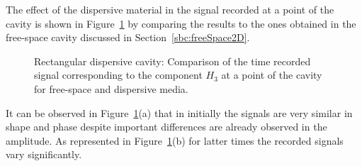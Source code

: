 The effect of the dispersive material in the signal recorded at a point of the cavity is shown in Figure~\ref{fig:freeSpaceDispersiveSignal} by comparing the results to the ones obtained in the free-space cavity discussed in Section~\ref{sbc:freeSpace2D}.
\begin{figure}[!ht]
	\centering
	\caption{Rectangular dispersive cavity: Comparison of the time recorded signal corresponding to the component $H_3$ at a point of the cavity for free-space and dispersive media.}
	\label{fig:freeSpaceDispersiveSignal}
\end{figure}
It can be observed in Figure~\ref{fig:freeSpaceDispersiveSignal}(a) that in initially the signals are very similar in shape and phase despite important differences are already observed in the amplitude. As represented in Figure~\ref{fig:freeSpaceDispersiveSignal}(b) for latter times the recorded signals vary significantly.

